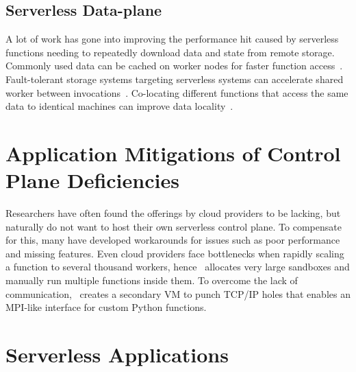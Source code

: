 \subsection{Serverless Data-plane}

A lot of work has gone into improving the performance hit caused by serverless functions needing to repeatedly download data and state from remote storage.
Commonly used data can be cached on worker nodes for faster function access~\cite{mvondo2021ofc,romero2021faa}.
Fault-tolerant storage systems targeting serverless systems can accelerate shared worker between invocations~\cite{giantsidi2023flexlog,sreekanti2020fault}.
Co-locating different functions that access the same data to identical machines can improve data locality~\cite{abdi2023palette}.

\section{Application Mitigations of Control Plane Deficiencies}

Researchers have often found the offerings by cloud providers to be lacking, but naturally do not want to host their own serverless control plane.
To compensate for this, many have developed workarounds for issues such as poor performance and missing features.
Even cloud providers face bottlenecks when rapidly scaling a function to several thousand workers, hence~\cite{basu2023propack} allocates very large sandboxes and manually run multiple functions inside them.
To overcome the lack of communication,~\cite{copik2023fmi} creates a secondary VM to punch TCP/IP holes that enables an MPI-like interface for custom Python functions.


\section{Serverless Applications}
\label{sec:serverless-apps}


